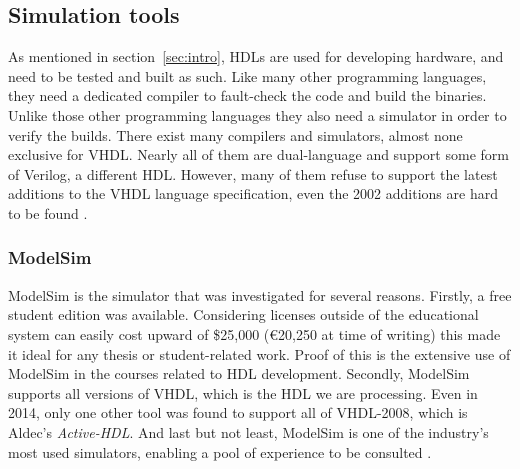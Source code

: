 \documentclass[11pt,british]{article}
\begin{document}

\subsection{Simulation tools}
\label{subsec:simtool}
As mentioned in section~\ref{sec:intro}, \gls{HDL}s are used for developing hardware, and need to be tested and built as such. Like many other programming languages, they need a dedicated compiler to fault-check the code and build the binaries. Unlike those other programming languages they also need a simulator in order to verify the builds. There exist many compilers and simulators, almost none exclusive for \gls{VHDL}. Nearly all of them are dual-language and support some form of Verilog, a different HDL. However, many of them refuse to support the latest additions to the VHDL language specification, even the 2002 additions are hard to be found \cite{ActiveHDL,Cadence,ISE,Quartus}.

\subsubsection{ModelSim}
ModelSim is the simulator that was investigated for several reasons. Firstly, a free student edition was available. Considering licenses  outside of the educational system can easily cost upward of \$25,000 (\euro20,250 at time of writing) this made it ideal for any thesis or student-related work. Proof of this is the extensive use of ModelSim in the courses related to HDL development. Secondly, ModelSim supports all versions of \gls{VHDL}, which is the \gls{HDL} we are processing. Even in 2014, only one other tool was found to support all of VHDL-2008, which is Aldec's \emph{Active-HDL}. And last but not least, ModelSim is one of the industry's most used simulators, enabling a pool of experience to be consulted \cite{ModelSim}.

\end{document}
